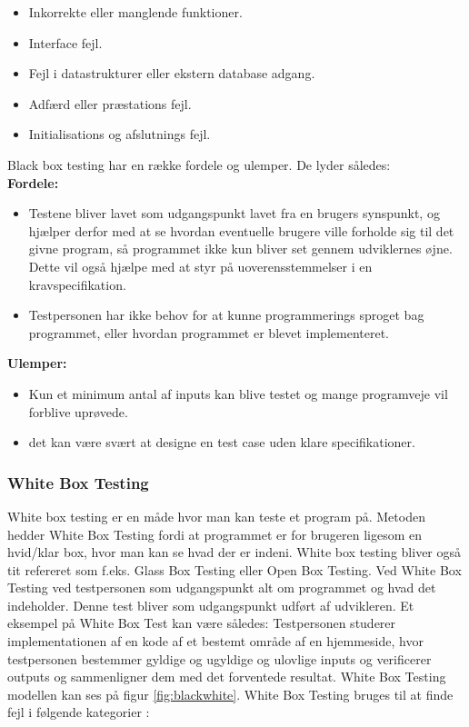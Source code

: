 \begin{itemize}
\item{Inkorrekte eller manglende funktioner}.
\item{Interface fejl.}
\item{Fejl i datastrukturer eller ekstern database adgang.}
\item{Adfærd eller præstations fejl.}
\item{Initialisations og afslutnings fejl.}
\end{itemize}

Black box testing har en række fordele og ulemper. De lyder således:\\

\textbf{Fordele:} 
\begin{itemize}
\item{Testene bliver lavet som udgangspunkt lavet fra en brugers synspunkt, og hjælper derfor med at se hvordan eventuelle brugere ville forholde sig til det givne program, så programmet ikke kun bliver set gennem udviklernes øjne. Dette vil også hjælpe med at styr på uoverensstemmelser i en kravspecifikation.}
\item{Testpersonen har ikke behov for at kunne programmerings sproget bag programmet, eller hvordan programmet er blevet implementeret.}
\end{itemize}

\textbf{Ulemper:}
\begin{itemize}
\item{Kun et minimum antal af inputs kan blive testet og mange programveje vil forblive uprøvede.}
\item{det kan være svært at designe en test case uden klare specifikationer.}
\end{itemize}
\citep{Fundamentals2010}

\subsubsection{White Box Testing}

White box testing er en måde hvor man kan teste et program på. Metoden hedder White Box Testing fordi at programmet er for brugeren ligesom en hvid/klar box, hvor man kan se hvad der er indeni. White box testing bliver også tit refereret som f.eks. Glass Box Testing eller Open Box Testing. Ved White Box Testing ved testpersonen som udgangspunkt alt om programmet og hvad det indeholder. Denne test bliver som udgangspunkt udført af udvikleren. Et eksempel på White Box Test kan være således: Testpersonen studerer implementationen af en kode af et bestemt område af en hjemmeside, hvor testpersonen bestemmer gyldige og ugyldige og ulovlige inputs og verificerer outputs og sammenligner dem med det forventede resultat. White Box Testing modellen kan ses på figur \ref{fig:blackwhite}. White Box Testing bruges til at finde fejl i følgende kategorier \cite{Guru992015}:

